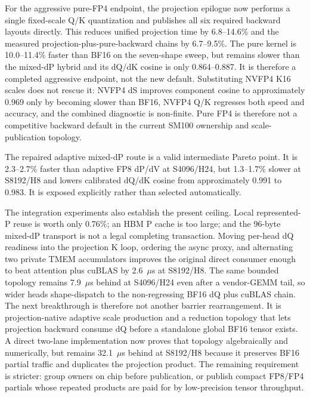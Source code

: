 For the aggressive pure-FP4 endpoint, the projection epilogue now performs a
single fixed-scale Q/K quantization and publishes all six required backward
layouts directly.  This reduces unified projection time by 6.8--14.6\% and
the measured projection-plus-pure-backward chains by 6.7--9.5\%.  The pure
kernel is 10.0--11.4\% faster than BF16 on the seven-shape sweep, but remains
slower than the mixed-dP hybrid and its dQ/dK cosine is only 0.864--0.887.
It is therefore a completed aggressive endpoint, not the new default.
Substituting NVFP4 K16 scales does not rescue it: NVFP4 dS improves component
cosine to approximately 0.969 only by becoming slower than BF16, NVFP4 Q/K
regresses both speed and accuracy, and the combined diagnostic is non-finite.
Pure FP4 is therefore not a competitive backward default in the current
SM100 ownership and scale-publication topology.

The repaired adaptive mixed-dP route is a valid intermediate Pareto point.
It is 2.3--2.7\% faster than adaptive FP8 dP/dV at S4096/H24, but 1.3--1.7\%
slower at S8192/H8 and lowers calibrated dQ/dK cosine from approximately
0.991 to 0.983.  It is exposed explicitly rather than selected automatically.

The integration experiments also establish the present ceiling.  Local
represented-P reuse is worth only 0.76\%; an HBM P cache is too large; and the
96-byte mixed-dP transport is not a legal completing transaction.  Moving
per-head dQ readiness into the projection K loop, ordering the async proxy,
and alternating two private TMEM accumulators improves the original direct
consumer enough to beat attention plus cuBLAS by 2.6~$\mu$s at S8192/H8.
The same bounded topology remains 7.9~$\mu$s behind at S4096/H24 even after a
vendor-GEMM tail, so wider heads shape-dispatch to the non-regressing BF16
dQ plus cuBLAS chain.  The next breakthrough is therefore not another barrier
rearrangement.  It is projection-native adaptive scale production and a
reduction topology that lets projection backward consume dQ before a
standalone global BF16 tensor exists.  A direct two-lane implementation now
proves that topology algebraically and numerically, but remains 32.1~$\mu$s
behind at S8192/H8 because it preserves BF16 partial traffic and duplicates
the projection product.  The remaining requirement is stricter: group owners
on chip before publication, or publish compact FP8/FP4 partials whose repeated
products are paid for by low-precision tensor throughput.

